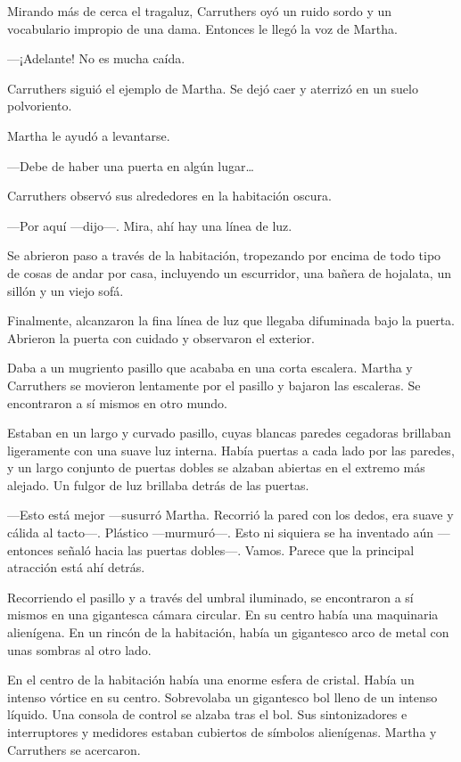 Mirando más de cerca el tragaluz, Carruthers oyó un ruido sordo y un
vocabulario impropio de una dama. Entonces le llegó la voz de Martha.

---¡Adelante! No es mucha caída.

Carruthers siguió el ejemplo de Martha. Se dejó caer y aterrizó en un
suelo polvoriento.

Martha le ayudó a levantarse.

---Debe de haber una puerta en algún lugar\ldots{}

Carruthers observó sus alrededores en la habitación oscura.

---Por aquí ---dijo---. Mira, ahí hay una línea de luz.

Se abrieron paso a través de la habitación, tropezando por encima de
todo tipo de cosas de andar por casa, incluyendo un escurridor, una
bañera de hojalata, un sillón y un viejo sofá.

Finalmente, alcanzaron la fina línea de luz que llegaba difuminada bajo
la puerta. Abrieron la puerta con cuidado y observaron el exterior.

Daba a un mugriento pasillo que acababa en una corta escalera. Martha y
Carruthers se movieron lentamente por el pasillo y bajaron las
escaleras. Se encontraron a sí mismos en otro mundo.

Estaban en un largo y curvado pasillo, cuyas blancas paredes cegadoras
brillaban ligeramente con una suave luz interna. Había puertas a cada
lado por las paredes, y un largo conjunto de puertas dobles se alzaban
abiertas en el extremo más alejado. Un fulgor de luz brillaba detrás de
las puertas.

---Esto está mejor ---susurró Martha. Recorrió la pared con los dedos,
era suave y cálida al tacto---. Plástico ---murmuró---. Esto ni siquiera
se ha inventado aún ---entonces señaló hacia las puertas dobles---.
Vamos. Parece que la principal atracción está ahí detrás.

Recorriendo el pasillo y a través del umbral iluminado, se encontraron a
sí mismos en una gigantesca cámara circular. En su centro había una
maquinaria alienígena. En un rincón de la habitación, había un
gigantesco arco de metal con unas sombras al otro lado.

En el centro de la habitación había una enorme esfera de cristal. Había
un intenso vórtice en su centro. Sobrevolaba un gigantesco bol lleno de
un intenso líquido. Una consola de control se alzaba tras el bol. Sus
sintonizadores e interruptores y medidores estaban cubiertos de símbolos
alienígenas. Martha y Carruthers se acercaron.


